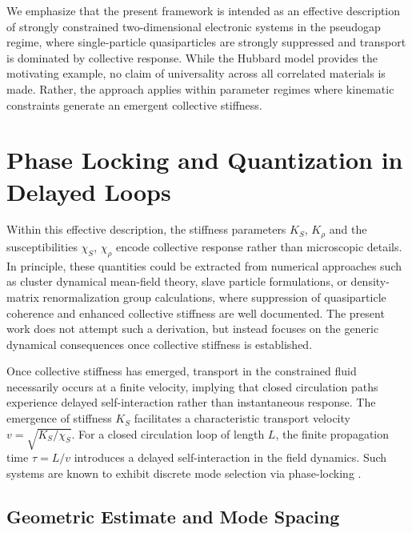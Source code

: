 \documentclass[11pt, a4paper]{article}
\begin{document}
            We emphasize that the present framework is intended as an effective description of strongly constrained two-dimensional electronic systems in the pseudogap regime, where single-particle quasiparticles are strongly suppressed and transport is dominated by collective response. While the Hubbard model provides the motivating example, no claim of universality across all correlated materials is made. Rather, the approach applies within parameter regimes where kinematic constraints generate an emergent collective stiffness.

        \section{Phase Locking and Quantization in Delayed Loops}

            Within this effective description, the stiffness parameters $K_S$, $K_\rho$ and the susceptibilities $\chi_S$, $\chi_\rho$ encode collective response rather than microscopic details. In principle, these quantities could be extracted from numerical approaches such as cluster dynamical mean-field theory, slave particle formulations, or density-matrix renormalization group calculations, where suppression of quasiparticle coherence and enhanced collective stiffness are well documented. The present work does not attempt such a derivation, but instead focuses on the generic dynamical consequences once collective stiffness is established.

            Once collective stiffness has emerged, transport in the constrained fluid necessarily occurs at a finite velocity, implying that closed circulation paths experience delayed self-interaction rather than instantaneous response. The emergence of stiffness $K_S$ facilitates a characteristic transport velocity $v = \sqrt{K_S / \chi_S}$. For a closed circulation loop of length $L$, the finite propagation time $\tau = L/v$ introduces a delayed self-interaction in the field dynamics. Such systems are known to exhibit discrete mode selection via phase-locking \cite{Erneux2009}.

            \subsection{Geometric Estimate and Mode Spacing}
\end{document}
